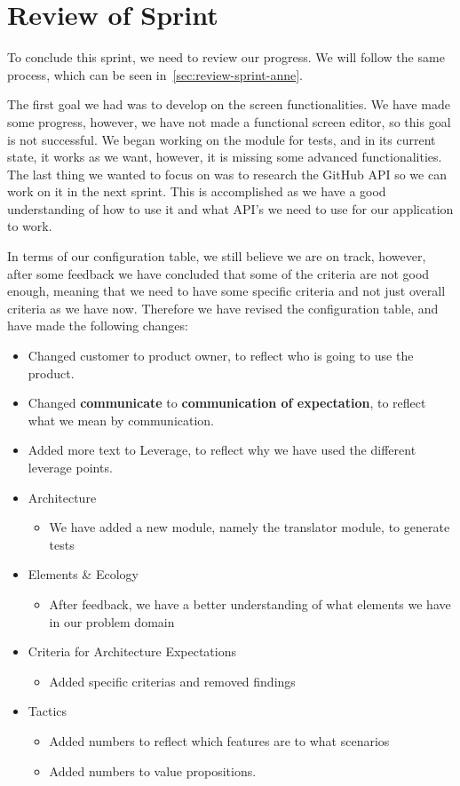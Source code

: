 \section{Review of Sprint}\label{sec:review-sprint-two}
To conclude this sprint, we need to review our progress.
We will follow the same process, which can be seen in~\autoref{sec:review-sprint-anne}.

The first goal we had was to develop on the screen functionalities.
We have made some progress, however, we have not made a functional screen editor, so this goal is not successful.
We began working on the module for tests, and in its current state, it works as we want, however, it is missing some advanced functionalities.
The last thing we wanted to focus on was to research the GitHub API so we can work on it in the next sprint.
This is accomplished as we have a good understanding of how to use it and what API's we need to use for our application to work.

In terms of our configuration table, we still believe we are on track, however, after some feedback we have concluded that some of the criteria are not good enough, meaning that we need to have some specific criteria and not just overall criteria as we have now.
Therefore we have revised the configuration table, and have made the following changes:


\begin{itemize}
    \item Changed customer to product owner, to reflect who is going to use the product.
    \item Changed \textbf{communicate} to \textbf{communication of expectation}, to reflect what we mean by communication.
    \item Added more text to Leverage, to reflect why we have used the different leverage points.
    \item Architecture
        \begin{itemize}
            \item We have added a new module, namely the translator module, to generate tests
        \end{itemize}
    \item Elements \& Ecology
        \begin{itemize}
            \item After feedback, we have a better understanding of what elements we have in our problem domain
        \end{itemize}
    \item Criteria for Architecture Expectations
        \begin{itemize}
            \item Added specific criterias and removed findings
        \end{itemize} 
    \item Tactics
        \begin{itemize}
            \item Added numbers to reflect which features are to what scenarios
            \item Added numbers to value propositions.
        \end{itemize} 
\end{itemize}

